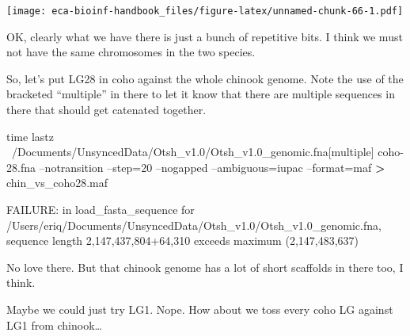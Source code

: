 \documentclass[]{krantz}
\makeatletter
\newenvironment{Shaded}{\begin{snugshade}}{\end{snugshade}}
\newcommand{\BuiltInTok}[1]{#1}
\newcommand{\CommentTok}[1]{\textcolor[rgb]{0.37,0.37,0.37}{\textit{#1}}}
\newcommand{\DataTypeTok}[1]{\textcolor[rgb]{0.27,0.27,0.27}{#1}}
\newcommand{\ExtensionTok}[1]{#1}
\newcommand{\FunctionTok}[1]{\textcolor[rgb]{0,0,0}{#1}}
\newcommand{\KeywordTok}[1]{\textcolor[rgb]{0.27,0.27,0.27}{\textbf{#1}}}
\newcommand{\NormalTok}[1]{#1}
\newcommand{\OperatorTok}[1]{\textcolor[rgb]{0.43,0.43,0.43}{\textbf{#1}}}
\newcommand{\StringTok}[1]{\textcolor[rgb]{0.5,0.5,0.5}{#1}}
\newcommand{\VariableTok}[1]{\textcolor[rgb]{0,0,0}{#1}}
\newenvironment{kframe}{%
\medskip{}
\setlength{\fboxsep}{.8em}
 \def\at@end@of@kframe{}%
 \ifinner\ifhmode%
  \def\at@end@of@kframe{\end{minipage}}%
  \begin{minipage}{\columnwidth}%
 \fi\fi%
 \def\FrameCommand##1{\hskip\@totalleftmargin \hskip-\fboxsep
 \colorbox{shadecolor}{##1}\hskip-\fboxsep
     \hskip-\linewidth \hskip-\@totalleftmargin \hskip\columnwidth}%
 \MakeFramed {\advance\hsize-\width
   \@totalleftmargin\z@ \linewidth\hsize
   \@setminipage}}%
 {\par\unskip\endMakeFramed%
 \at@end@of@kframe}
\renewenvironment{Shaded}{\begin{kframe}}{\end{kframe}}
\makeatother
\begin{document}
\texttt{[image: eca-bioinf-handbook\_files/figure-latex/unnamed-chunk-66-1.pdf]}

OK, clearly what we have there is just a bunch of repetitive bits. I think we must not have the same chromosomes in the two species.

So, let's put LG28 in coho against the whole chinook genome. Note the use of the
bracketed ``multiple'' in there to let it know that there are multiple sequences in there
that should get catenated together.

\begin{Shaded}
\begin{Highlighting}[]
\BuiltInTok{time}\NormalTok{ lastz ~/Documents/UnsyncedData/Otsh_v1.0/Otsh_v1.0_genomic.fna[multiple]  coho-28.fna --notransition --step=20 --nogapped --ambiguous=iupac --format=maf }\OperatorTok{>}\NormalTok{ chin_vs_coho28.maf}

\ExtensionTok{FAILURE}\NormalTok{: in load_fasta_sequence for /Users/eriq/Documents/UnsyncedData/Otsh_v1.0/Otsh_v1.0_genomic.fna, sequence length 2,147,437,804+64,310 exceeds maximum (2,147,483,637)}
\end{Highlighting}
\end{Shaded}

No love there. But that chinook genome has a lot of short scaffolds in there too, I think.

Maybe we could just try LG1. Nope. How about we toss every coho LG against LG1 from chinook\ldots{}

\begin{Shaded}
\end{Shaded}
\end{document}
